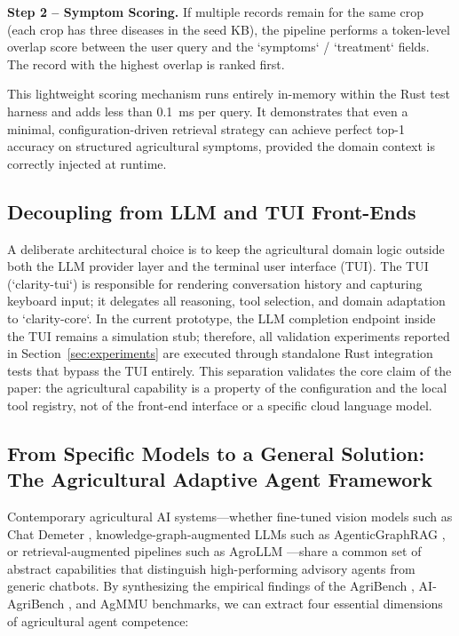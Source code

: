 \textbf{Step 2 -- Symptom Scoring.} If multiple records remain for the same crop (each crop has three diseases in the seed KB), the pipeline performs a token-level overlap score between the user query and the `symptoms` / `treatment` fields. The record with the highest overlap is ranked first.

This lightweight scoring mechanism runs entirely in-memory within the Rust test harness and adds less than 0.1~ms per query. It demonstrates that even a minimal, configuration-driven retrieval strategy can achieve perfect top-1 accuracy on structured agricultural symptoms, provided the domain context is correctly injected at runtime.

\subsection{Decoupling from LLM and TUI Front-Ends}

A deliberate architectural choice is to keep the agricultural domain logic outside both the LLM provider layer and the terminal user interface (TUI). The TUI (`clarity-tui`) is responsible for rendering conversation history and capturing keyboard input; it delegates all reasoning, tool selection, and domain adaptation to `clarity-core`. In the current prototype, the LLM completion endpoint inside the TUI remains a simulation stub; therefore, all validation experiments reported in Section~\ref{sec:experiments} are executed through standalone Rust integration tests that bypass the TUI entirely. This separation validates the core claim of the paper: the agricultural capability is a property of the configuration and the local tool registry, not of the front-end interface or a specific cloud language model.

\subsection{From Specific Models to a General Solution: The Agricultural Adaptive Agent Framework}

Contemporary agricultural AI systems---whether fine-tuned vision models such as Chat Demeter \cite{chatdemeter2025}, knowledge-graph-augmented LLMs such as AgenticGraphRAG \cite{agenticgraphrag2025}, or retrieval-augmented pipelines such as AgroLLM \cite{samuel2025agrollm}---share a common set of abstract capabilities that distinguish high-performing advisory agents from generic chatbots. By synthesizing the empirical findings of the AgriBench \cite{deepplants2024agribench}, AI-AgriBench \cite{anshankul2024}, and AgMMU \cite{agmmu2025} benchmarks, we can extract four essential dimensions of agricultural agent competence:

